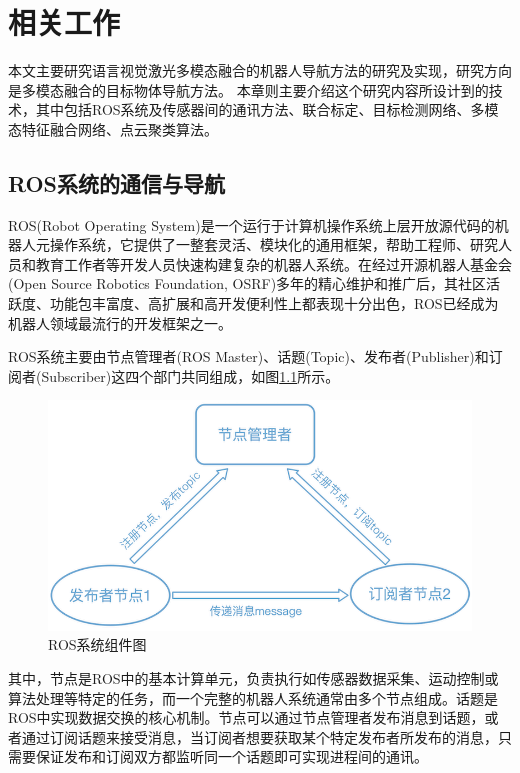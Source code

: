 \chapter{相关工作}

本文主要研究语言视觉激光多模态融合的机器人导航方法的研究及实现，研究方向是多模态融合的目标物体导航方法。
本章则主要介绍这个研究内容所设计到的技术，其中包括ROS系统及传感器间的通讯方法、联合标定、目标检测网络、多模态特征融合网络、点云聚类算法。


\section{ROS系统的通信与导航}
ROS(Robot Operating System)是一个运行于计算机操作系统上层开放源代码的机器人元操作系统，它提供了一整套灵活、模块化的通用框架，帮助工程师、研究人员和教育工作者等开发人员快速构建复杂的机器人系统。在经过开源机器人基金会(Open Source Robotics Foundation, OSRF)多年的精心维护和推广后，其社区活跃度、功能包丰富度、高扩展和高开发便利性上都表现十分出色，ROS已经成为机器人领域最流行的开发框架之一。

ROS系统主要由节点管理者(ROS Master)、话题(Topic)、发布者(Publisher)和订阅者(Subscriber)这四个部门共同组成，如图\ref{frossystem}所示。
\begin{figure}[htbp]
    \centering
    \includegraphics[scale=0.80]{Fig/rossystem.png}
    \caption{\label{frossystem}ROS系统组件图}
\end{figure}
其中，节点是ROS中的基本计算单元，负责执行如传感器数据采集、运动控制或算法处理等特定的任务，而一个完整的机器人系统通常由多个节点组成。话题是ROS中实现数据交换的核心机制。节点可以通过节点管理者发布消息到话题，或者通过订阅话题来接受消息，当订阅者想要获取某个特定发布者所发布的消息，只需要保证发布和订阅双方都监听同一个话题即可实现进程间的通讯。



